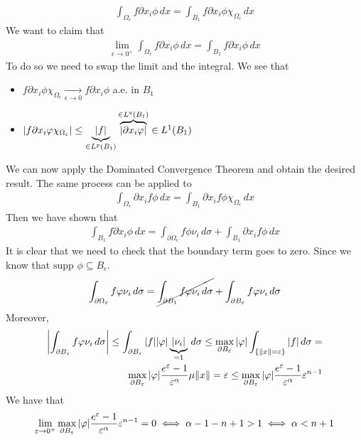 \[
    \begin{split}
        \int_{\Omega_\epsilon} f \partial x_i \phi \, dx = \int_{B_1} f \partial x_i \phi \chi_{\Omega_\epsilon} \, dx
    \end{split}
\]
We want to claim that 
\[
    \begin{split}
        \lim_{\epsilon \to 0^+} \int_{\Omega_\epsilon} f \partial x_i \phi \, dx = \int_{B_1} f \partial x_i \phi \, dx
    \end{split}
\]
To do so we need to swap the limit and the integral. We see that 
\begin{itemize}
    \item \(f \partial x_i \phi \chi_{\Omega_\epsilon} \underset{\epsilon \to 0}{\longrightarrow} f \partial x_i \phi\) a.e. in \(B_1\)
    \item \(\abs{f \partial x_i \phi \chi_{\Omega_\epsilon}} \leq \underbrace{\abs{f}}_{\in L^p(B_1)} \overbrace{\abs{\partial x_i \phi}}^{\in L^q(B_1)} \in L^1(B_1)\)
\end{itemize}
We can now apply the Dominated Convergence Theorem and obtain the desired result. 
The same process can be applied to
\[
    \begin{split}
        \int_{\Omega_\epsilon} \partial x_i f \phi \, dx = \int_{B_1} \partial x_i f \phi \chi_{\Omega_\epsilon} \, dx
    \end{split}
\]
Then we have shown that 
\[
    \begin{split}
        \int_{B_1} f \partial x_i \phi \, dx = \int_{\partial\Omega_\epsilon} f \phi \nu_i \, d\sigma + \int_{B_1} \partial x_i f \phi \, dx
    \end{split}
\]
It is clear that we need to check that the boundary term goes to zero. Since we know that \(\text{supp } \phi \subseteq B_\epsilon\).
\[
    \begin{split}
        \int_{\partial\Omega_\epsilon} f \phi \nu_i \, d\sigma = \cancel{\int_{\partial B_1} f \phi \nu_i \, d\sigma} + \int_{\partial B_\epsilon} f \phi \nu_i \, d\sigma
    \end{split}
\]
Moreover,
\[
    \begin{split}
        \abs{\int_{\partial B_\epsilon} f \phi \nu_i \, d\sigma} \leq \int_{\partial B_\epsilon} \abs{f} \abs{\phi} \underbrace{\abs{\nu_i}}_{=1} \, d\sigma \leq \max_{\partial B_\epsilon} \abs{\phi} \int_{\{ \norm{x} = \epsilon \}} \abs{f} \, d\sigma = \\
        \max_{\partial B_\epsilon} \abs{\phi} \frac{e^{\epsilon} - 1}{\epsilon^\alpha} \mu{\norm{x} = \epsilon} \leq \max_{\partial B_\epsilon} \abs{\phi} \frac{e^{\epsilon} - 1}{\epsilon^\alpha} \epsilon^{n-1} 
    \end{split}
\]
We have that 
\[
    \begin{split}
        \lim_{\epsilon \to 0^+} \max_{\partial B_\epsilon} \abs{\phi} \frac{e^{\epsilon} - 1}{\epsilon^\alpha} \epsilon^{n-1} = 0 \iff \alpha - 1 - n + 1 > 1 \iff \alpha < n + 1
    \end{split}
\]


